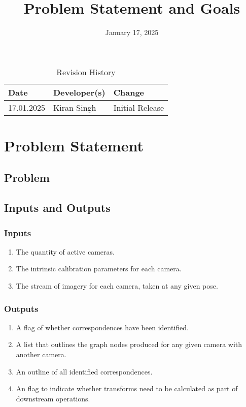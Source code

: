 \documentclass{article}
\title{Problem Statement and Goals\\\progname}
\author{\authname}
\date{January 17, 2025}
\begin{document}
\maketitle

\begin{table}[hp]
\caption{Revision History} \label{TblRevisionHistory}
\begin{tabularx}{\textwidth}{llX}
\toprule
\textbf{Date} & \textbf{Developer(s)} & \textbf{Change}\\
\midrule
17.01.2025 & Kiran Singh & Initial Release\\
\bottomrule
\end{tabularx}
\end{table}

\section{Problem Statement}



\subsection{Problem}

\subsection{Inputs and Outputs}
\subsubsection{Inputs}
\begin{enumerate}
    \item The quantity of active cameras.
    \item The intrinsic calibration parameters for each camera.
    \item The stream of imagery for each camera, taken at any given pose.
\end{enumerate}  

\subsubsection{Outputs}
\begin{enumerate}
    \item A flag of whether correspondences have been identified.
    \item A list that outlines the graph nodes produced for any given camera with another camera.
    \item An outline of all identified correspondences.
    \item An flag to indicate whether transforms need to be calculated as part of downstream operations.
\end{enumerate}  
\end{document}
